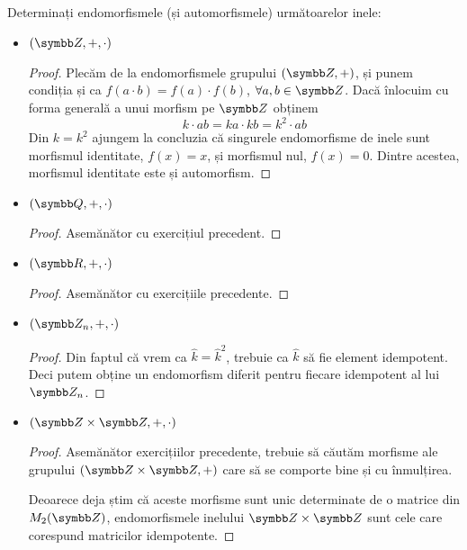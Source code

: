 \begin{exercise}[3.10]
Determinați endomorfismele (și automorfismele) următoarelor inele:
\begin{itemize}
    \item \((\integers, +, \cdot)\)
    \begin{proof}
    Plecăm de la endomorfismele grupului \((\integers, +)\), și punem condiția și ca \(f(a \cdot b) = f(a) \cdot f(b)\), \(\forall a, b \in \integers\). Dacă înlocuim cu forma generală a unui morfism pe \(\integers\) obținem
    \[
        k \cdot a b = k a \cdot k b = k^2 \cdot a b
    \]
    Din \(k = k^2\) ajungem la concluzia că singurele endomorfisme de inele sunt morfismul identitate, \(f(x) = x\), și morfismul nul, \(f(x) = 0\). Dintre acestea, morfismul identitate este și automorfism.
    \end{proof}
    
    \item \((\rationals, +, \cdot)\)
    \begin{proof}
    Asemănător cu exercițiul precedent.
    \end{proof}
    
    \item \((\reals, +, \cdot)\)
    \begin{proof}
    Asemănător cu exercițiile precedente.
    \end{proof}
    
    \item \((\integersmod{n}, +, \cdot)\)
    \begin{proof}
    Din faptul că vrem ca \(\widehat{k} = \widehat{k}^2\), trebuie ca \(\widehat{k}\) să fie element idempotent. Deci putem obține un endomorfism diferit pentru fiecare idempotent al lui \(\integersmod{n}\).
    \end{proof}
    
    \item \((\integers \times \integers, +, \cdot)\)
    \begin{proof}
    Asemănător exercițiilor precedente, trebuie să căutăm morfisme ale grupului \((\integers \times \integers, +)\) care să se comporte bine și cu înmulțirea.
    
    Deoarece deja știm că aceste morfisme sunt unic determinate de o matrice din \(\matrices{2}{\integers}\), endomorfismele inelului \(\integers \times \integers\) sunt cele care corespund matricilor idempotente.
    \end{proof}
\end{itemize}
\end{exercise}

